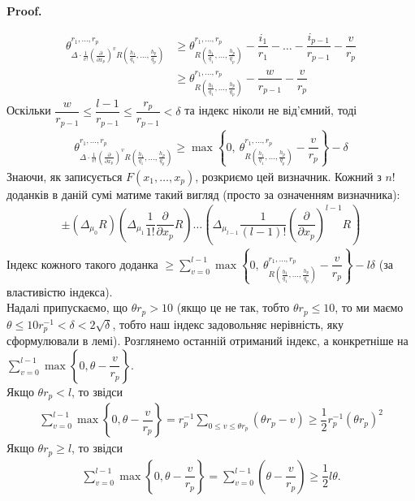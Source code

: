 \documentclass[a4paper, 10pt]{article}
\makeatletter
\theoremstyle{theoremdd}
\theoremstyle{theoremdd}
\theoremstyle{theoremdd}
\theoremstyle{theoremdd}
\theoremstyle{theoremdd}
\theoremstyle{theoremdd}
\theoremstyle{theoremdd}
\theoremstyle{theoremdd}
\theoremstyle{theoremdd}
\theoremstyle{theoremdd}
\theoremstyle{theoremdd}
\theoremstyle{theoremdd}
\theoremstyle{theoremdd}
\theoremstyle{theoremdd}
\theoremstyle{theoremdd}
\renewenvironment{proof}[1][Proof.\\]{\par
\pushQED{\hfill \qed}%
\normalfont \topsep6\p@\@plus6\p@\relax
\trivlist
\item\relax
{\bfseries
#1\@addpunct{.}}\hspace\labelsep\ignorespaces
}{%
\popQED\endtrivlist\@endpefalse
}
\makeatother
\begin{document}
\begin{proof}
\begin{align*}
\theta_{\Delta \cdot \frac{1}{v!} \left( \frac{\partial}{\partial x_p} \right)^v R \left( \frac{h_1}{q_1},\dots,\frac{h_p}{q_p} \right)}^{r_1,\dots,r_p} & \geq \theta_{R\left( \frac{h_1}{q_1},\dots,\frac{h_p}{q_p} \right)}^{r_1,\dots,r_p} - \dfrac{i_1}{r_1} - \dots - \dfrac{i_{p-1}}{r_{p-1}} - \dfrac{v}{r_p} \\
& \geq \theta_{R\left( \frac{h_1}{q_1},\dots,\frac{h_p}{q_p} \right)}^{r_1,\dots,r_p} - \dfrac{w}{r_{p-1}} - \dfrac{v}{r_p}
\end{align*}
Оскільки $\dfrac{w}{r_{p-1}} \leq \dfrac{l-1}{r_{p-1}} \leq \dfrac{r_p}{r_{p-1}} < \delta$ та індекс ніколи не від'ємний, тоді
\begin{align*}
\theta_{\Delta \cdot \frac{1}{v!} \left( \frac{\partial}{\partial x_p} \right)^v R \left( \frac{h_1}{q_1},\dots,\frac{h_p}{q_p} \right)}^{r_1,\dots,r_p} \geq \max \left\{ 0,\ \theta_{R\left( \frac{h_1}{q_1},\dots,\frac{h_p}{q_p} \right)}^{r_1,\dots,r_p} - \dfrac{v}{r_p} \right\} - \delta
\end{align*}
Знаючи, як записується $F(x_1,\dots,x_p)$, розкриємо цей визначник. Кожний з $n!$ доданків в даній сумі матиме такий вигляд (просто за означенням визначника):
\begin{align*}
\pm (\Delta_{\mu_0} R) \left( \Delta_{\mu_1} \dfrac{1}{1!} \dfrac{\partial}{\partial x_p} R \right) \dots \left( \Delta_{\mu_{l-1}} \dfrac{1}{(l-1)!} \left( \dfrac{\partial}{\partial x_p} \right)^{l-1} R \right)
\end{align*}
Індекс кожного такого доданка $\geq \displaystyle\sum_{v=0}^{l-1} \max \left\{ 0,\ \theta_{R\left( \frac{h_1}{q_1},\dots,\frac{h_p}{q_p} \right)}^{r_1,\dots,r_p} - \dfrac{v}{r_p} \right\} - l \delta$ (за властивістю індекса).\\
Надалі припускаємо, що $\theta r_p > 10$ (якщо це не так, тобто $\theta r_p \leq 10$, то ми маємо $\theta \leq 10r_p^{-1} < \delta < 2 \sqrt{\delta}$, тобто наш індекс задовольняє нерівність, яку сформулювали в лемі). Розглянемо останній отриманий індекс, а конкретніше на $\displaystyle\sum_{v=0}^{l-1} \max \left\{ 0, \theta - \dfrac{v}{r_p} \right\}$.\\
Якщо $\theta r_p < l$, то звідси
\begin{align*}
\sum_{v=0}^{l-1} \max \left\{ 0,\theta - \dfrac{v}{r_p} \right\} = r_p^{-1} \sum_{0 \leq v \leq \theta r_p} (\theta r_p - v) \geq \dfrac{1}{2} r_p^{-1} (\theta r_p)^2
\end{align*}
Якщо $\theta r_p \geq l$, то звідси
\begin{align*}
\sum_{v=0}^{l-1} \max \left\{ 0,\theta - \dfrac{v}{r_p} \right\} = \sum_{v=0}^{l-1} \left( \theta - \dfrac{v}{r_p} \right) \geq \dfrac{1}{2} l \theta.

\end{align*}
\end{proof}
\end{document}
